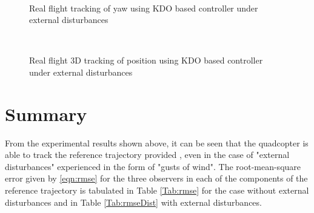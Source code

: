 \documentclass[letterpaper%
, twoside%
, 12pt%
,memoire%
, english%
,creativecommons,hyperref%
]{thETS}
\begin{document}
\begin{figure}[H]
	\centering
	 \\ \parbox{0.75\textwidth}{\caption{Real flight tracking of yaw using KDO based controller under external disturbances\label{Fig:yawtracKDODist}}}
\end{figure}
\begin{figure}[H]
	\centering
	 \\ \parbox{0.75\textwidth}{\caption{Real flight 3D tracking of position using KDO based controller under external disturbances\label{Fig:3dKDODist}}}
\end{figure}
\FloatBarrier


\section{Summary}
From the experimental results shown above, it can be seen that the quadcopter is able to track the reference trajectory provided , even in the case of  "external disturbances" experienced in the form of "gusts of wind". The root-mean-square error given by \eqref{eqn:rmse} for the three observers in each of the components of the reference trajectory is tabulated in Table \ref{Tab:rmse} for the case without external disturbances and in Table \ref{Tab:rmseDist} with external disturbances. 
\end{document}
